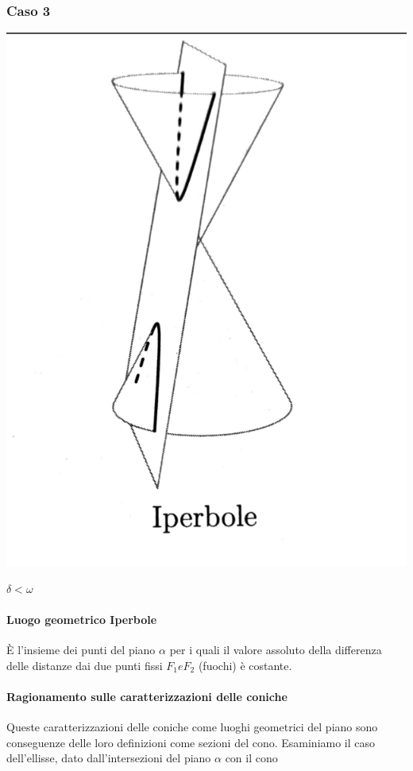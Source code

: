 \documentclass[a4paper,11pt]{article}
\begin{document}
\subsubsection{Caso 3}
\begin{center}
\begin{minipage}{8cm}
    \includegraphics[scale=0.3]{iperbole.png}
\end{minipage}
\end{center}
\(  \delta < \omega \)



\paragraph{Luogo geometrico Iperbole}
È l'insieme dei punti del piano \( \alpha \) per i quali il valore assoluto della differenza delle distanze dai due punti fissi \( F_1 e F_2\) (fuochi) è costante.
  

\paragraph{Ragionamento sulle caratterizzazioni delle coniche}
Queste caratterizzazioni delle coniche come luoghi geometrici del piano sono conseguenze delle loro definizioni come sezioni del cono.
Esaminiamo il caso dell'ellisse, dato dall'intersezioni del piano \( \alpha \) con il cono
\end{document}
